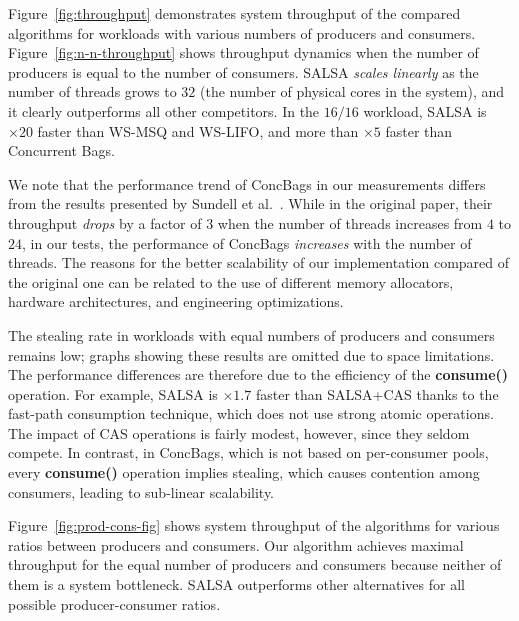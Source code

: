 Figure~\ref{fig:throughput} demonstrates system throughput of the compared algorithms for workloads with various numbers of producers and consumers. 
Figure~\ref{fig:n-n-throughput} shows throughput dynamics when the number of producers is equal to the number of consumers. SALSA \emph{scales linearly} as the number of threads grows to $32$ (the number of physical cores in the system), and it clearly outperforms all other competitors. In the $16/16$ workload, SALSA is $\times20$ faster than WS-MSQ and WS-LIFO, and more than $\times5$ faster than Concurrent Bags. 

We note that the performance trend of ConcBags in our measurements differs from the results presented by Sundell et al.~\cite{Sundell:2011:LAC:1989493.1989550}. 
While in the original paper, their throughput \emph{drops} by a factor of $3$ when the number of threads increases from $4$ to $24$, in our tests, the performance of ConcBags \emph{increases} with the number of threads. The reasons for the better scalability of our implementation compared of the original one can be related to the use of different memory allocators, hardware architectures, and engineering optimizations. %

The stealing rate in workloads with equal numbers of producers and consumers remains low; graphs showing these results are omitted due to space limitations. The performance differences are therefore due to the efficiency of the {\bf consume()} operation. 
For example, SALSA is $\times1.7$ faster than SALSA+CAS thanks to the fast-path consumption technique, which does not use strong atomic operations. The impact of CAS operations is fairly modest, however, since they seldom compete.
In contrast, in ConcBags, which is not based on per-consumer pools, every {\bf consume()} operation implies stealing, which causes contention among consumers, leading to sub-linear scalability.

Figure~\ref{fig:prod-cons-fig} shows system throughput of the algorithms for various ratios between producers and consumers. 
Our algorithm achieves maximal throughput for the equal number of producers and consumers because neither of them is a system bottleneck.
SALSA outperforms other alternatives for all possible producer-consumer ratios. 

